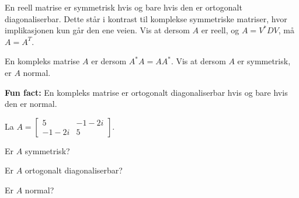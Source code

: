 \begin{oppgave}
En reell matrise er symmetrisk hvis og bare hvis den er ortogonalt diagonaliserbar. 
Dette står i kontrast til komplekse symmetriske matriser, hvor implikasjonen kun går den ene veien. 
Vis at dersom $A$ er reell, og $A=V^*DV$, må $A=A^T$.
\end{oppgave}

\begin{oppgave}
En kompleks matrise $A$ er  dersom $A^*A=AA^*$. 
Vis at dersom $A$ er symmetrisk, er $A$ normal. 

\textbf{Fun fact:} En kompleks matrise er ortogonalt diagonaliserbar hvis og bare hvis den er normal.
\end{oppgave}

\begin{oppgave}
La 
$
A=
\begin{bmatrix}
5 &-1-2i \\-1-2i & 5
\end{bmatrix}.
$
\begin{punkt}
Er $A$ symmetrisk?
\end{punkt}
\begin{punkt}
Er $A$ ortogonalt diagonaliserbar? 
\end{punkt}
\begin{punkt}
Er $A$ normal?
\end{punkt}
\end{oppgave}




